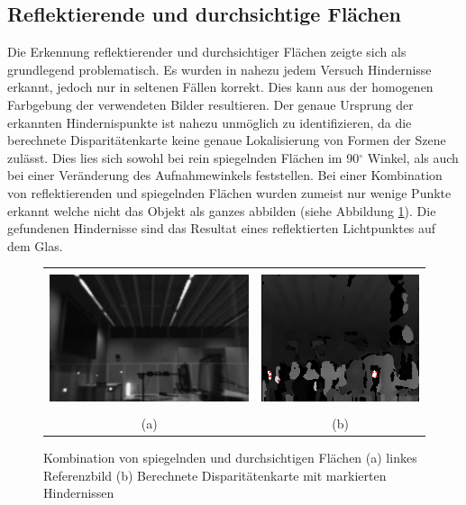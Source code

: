 \subsection{Reflektierende und durchsichtige Flächen}
\label{subsec:reflection_discussion}

\noindent
Die Erkennung reflektierender und durchsichtiger Flächen zeigte sich als grundlegend problematisch. Es wurden in nahezu jedem Versuch Hindernisse erkannt, jedoch nur in seltenen Fällen korrekt. Dies kann aus der homogenen Farbgebung der verwendeten Bilder resultieren. Der genaue Ursprung der erkannten Hindernispunkte ist nahezu unmöglich zu identifizieren, da die berechnete Disparitätenkarte keine genaue Lokalisierung von Formen der Szene zulässt. Dies lies sich sowohl bei rein spiegelnden Flächen im 90$^\circ$ Winkel, als auch bei einer Veränderung des Aufnahmewinkels feststellen. Bei einer Kombination von reflektierenden und spiegelnden Flächen wurden zumeist nur wenige Punkte erkannt welche nicht das Objekt als ganzes abbilden (siehe Abbildung \ref{fig:combination_images}). Die gefundenen Hindernisse sind das Resultat eines reflektierten Lichtpunktes auf dem Glas. 

\begin{figure}[!h]
	\centering
	\begin{tabular}{cc}
		\includegraphics[height=4cm]{img/reflection/reflection_trans_left} &
		\includegraphics[height=4cm]{img/reflection/reflection_trans_disp} \\
		(a) & (b)
	\end{tabular}
	\caption{Kombination von spiegelnden und durchsichtigen Flächen (a) linkes Referenzbild (b) Berechnete Disparitätenkarte mit markierten Hindernissen}
	\label{fig:combination_images}
\end{figure}


